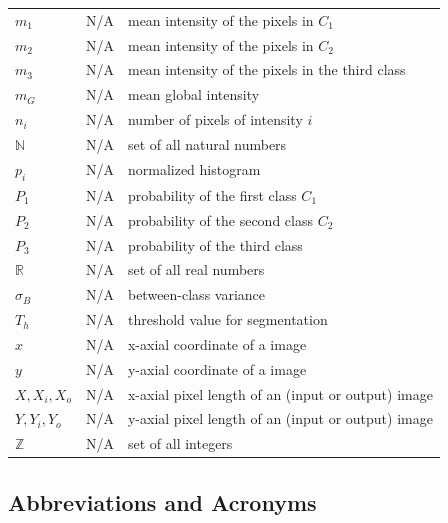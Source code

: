 \documentclass[12pt]{article}
\begin{document}
\begin{longtable*}{l l p{12cm}}
\\
$m_{1}$ & N/A & mean intensity of the pixels in $C_{1}$
\\
$m_{2}$ & N/A & mean intensity of the pixels in $C_{2}$
\\
$m_{3}$ & N/A & mean intensity of the pixels in the third class
\\
$m_{G}$ & N/A & mean global intensity
\\
$n_{i}$ & N/A & number of pixels of intensity $i$
\\
$\mathbb{N}$ & N/A & set of all natural numbers
\\
$p_{i}$ & N/A & normalized histogram
\\
$P_{1}$ & N/A & probability of the first class $C_{1}$
\\
$P_{2}$ & N/A & probability of the second class $C_{2}$
\\
$P_{3}$ & N/A & probability of the third class
\\
$\mathbb{R}$ & N/A & set of all real numbers
\\
$\sigma_{B}$ & N/A & between-class variance
\\
$T_{h}$ & N/A & threshold value for segmentation
\\
$x$ & N/A & x-axial coordinate of a image
\\
$y$ & N/A & y-axial coordinate of a image
\\
$X, X_i, X_o$ & N/A & x-axial pixel length of an (input or output) image
\\
$Y, Y_i, Y_o$ & N/A & y-axial pixel length of an (input or output) image
\\
$\mathbb{Z}$ & N/A & set of all integers
\\ 
\bottomrule
\end{longtable*}

\subsection{Abbreviations and Acronyms}
\end{document}
